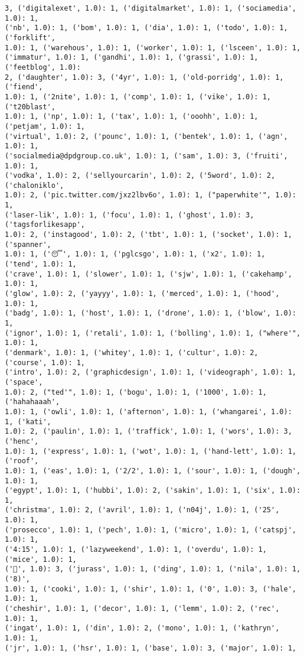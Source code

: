 \documentclass[11pt]{article}
\begin{document}
\begin{Verbatim}[commandchars=\\\{\}]
3, ('digitalexet', 1.0): 1, ('digitalmarket', 1.0): 1, ('sociamedia', 1.0): 1,
('nb', 1.0): 1, ('bom', 1.0): 1, ('dia', 1.0): 1, ('todo', 1.0): 1, ('forklift',
1.0): 1, ('warehous', 1.0): 1, ('worker', 1.0): 1, ('lsceen', 1.0): 1,
('immatur', 1.0): 1, ('gandhi', 1.0): 1, ('grassi', 1.0): 1, ('feetblog', 1.0):
2, ('daughter', 1.0): 3, ('4yr', 1.0): 1, ('old-porridg', 1.0): 1, ('fiend',
1.0): 1, ('2nite', 1.0): 1, ('comp', 1.0): 1, ('vike', 1.0): 1, ('t20blast',
1.0): 1, ('np', 1.0): 1, ('tax', 1.0): 1, ('ooohh', 1.0): 1, ('petjam', 1.0): 1,
('virtual', 1.0): 2, ('pounc', 1.0): 1, ('bentek', 1.0): 1, ('agn', 1.0): 1,
('socialmedia@dpdgroup.co.uk', 1.0): 1, ('sam', 1.0): 3, ('fruiti', 1.0): 1,
('vodka', 1.0): 2, ('sellyourcarin', 1.0): 2, ('5word', 1.0): 2, ('chaloniklo',
1.0): 2, ('pic.twitter.com/jxz2lbv6o', 1.0): 1, ("paperwhite'", 1.0): 1,
('laser-lik', 1.0): 1, ('focu', 1.0): 1, ('ghost', 1.0): 3, ('tagsforlikesapp',
1.0): 2, ('instagood', 1.0): 2, ('tbt', 1.0): 1, ('socket', 1.0): 1, ('spanner',
1.0): 1, ('😴', 1.0): 1, ('pglcsgo', 1.0): 1, ('x2', 1.0): 1, ('tend', 1.0): 1,
('crave', 1.0): 1, ('slower', 1.0): 1, ('sjw', 1.0): 1, ('cakehamp', 1.0): 1,
('glow', 1.0): 2, ('yayyy', 1.0): 1, ('merced', 1.0): 1, ('hood', 1.0): 1,
('badg', 1.0): 1, ('host', 1.0): 1, ('drone', 1.0): 1, ('blow', 1.0): 1,
('ignor', 1.0): 1, ('retali', 1.0): 1, ('bolling', 1.0): 1, ("where'", 1.0): 1,
('denmark', 1.0): 1, ('whitey', 1.0): 1, ('cultur', 1.0): 2, ('course', 1.0): 1,
('intro', 1.0): 2, ('graphicdesign', 1.0): 1, ('videograph', 1.0): 1, ('space',
1.0): 2, ("ted'", 1.0): 1, ('bogu', 1.0): 1, ('1000', 1.0): 1, ('hahahaaah',
1.0): 1, ('owli', 1.0): 1, ('afternon', 1.0): 1, ('whangarei', 1.0): 1, ('kati',
1.0): 2, ('paulin', 1.0): 1, ('traffick', 1.0): 1, ('wors', 1.0): 3, ('henc',
1.0): 1, ('express', 1.0): 1, ('wot', 1.0): 1, ('hand-lett', 1.0): 1, ('roof',
1.0): 1, ('eas', 1.0): 1, ('2/2', 1.0): 1, ('sour', 1.0): 1, ('dough', 1.0): 1,
('egypt', 1.0): 1, ('hubbi', 1.0): 2, ('sakin', 1.0): 1, ('six', 1.0): 1,
('christma', 1.0): 2, ('avril', 1.0): 1, ('n04j', 1.0): 1, ('25', 1.0): 1,
('prosecco', 1.0): 1, ('pech', 1.0): 1, ('micro', 1.0): 1, ('catspj', 1.0): 1,
('4:15', 1.0): 1, ('lazyweekend', 1.0): 1, ('overdu', 1.0): 1, ('mice', 1.0): 1,
('💃', 1.0): 3, ('jurass', 1.0): 1, ('ding', 1.0): 1, ('nila', 1.0): 1, ('8)',
1.0): 1, ('cooki', 1.0): 1, ('shir', 1.0): 1, ('0', 1.0): 3, ('hale', 1.0): 1,
('cheshir', 1.0): 1, ('decor', 1.0): 1, ('lemm', 1.0): 2, ('rec', 1.0): 1,
('ingat', 1.0): 1, ('din', 1.0): 2, ('mono', 1.0): 1, ('kathryn', 1.0): 1,
('jr', 1.0): 1, ('hsr', 1.0): 1, ('base', 1.0): 3, ('major', 1.0): 1,

\end{Verbatim}
\end{document}
